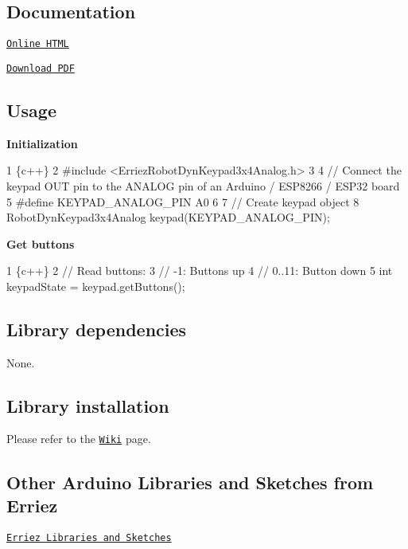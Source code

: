 \subsection*{Documentation}


\begin{DoxyItemize}
\item \href{https://Erriez.github.io/ErriezRobotDynKeypad3x4Analog}{\tt Online H\+T\+ML}
\item \href{https://github.com/Erriez/ErriezRobotDynKeypad3x4Analog/raw/gh-pages/latex/ErriezRobotDynKeypad3x4Analog.pdf}{\tt Download P\+DF}
\end{DoxyItemize}

\subsection*{Usage}

{\bfseries Initialization}


\begin{DoxyCode}
1 \{c++\}
2 #include <ErriezRobotDynKeypad3x4Analog.h>
3 
4 // Connect the keypad OUT pin to the ANALOG pin of an Arduino / ESP8266 / ESP32 board
5 #define KEYPAD\_ANALOG\_PIN   A0
6 
7 // Create keypad object
8 RobotDynKeypad3x4Analog keypad(KEYPAD\_ANALOG\_PIN);
\end{DoxyCode}


{\bfseries Get buttons}


\begin{DoxyCode}
1 \{c++\}
2 // Read buttons:
3 // -1:    Buttons up
4 // 0..11: Button down
5 int keypadState = keypad.getButtons();
\end{DoxyCode}


\subsection*{Library dependencies}


\begin{DoxyItemize}
\item None.
\end{DoxyItemize}

\subsection*{Library installation}

Please refer to the \href{https://github.com/Erriez/ErriezArduinoLibrariesAndSketches/wiki}{\tt Wiki} page.

\subsection*{Other Arduino Libraries and Sketches from Erriez}


\begin{DoxyItemize}
\item \href{https://github.com/Erriez/ErriezArduinoLibrariesAndSketches}{\tt Erriez Libraries and Sketches} 
\end{DoxyItemize}